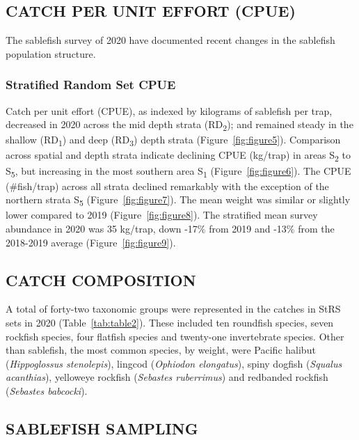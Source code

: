 \documentclass[12pt]{article}\usepackage[]{graphicx}\usepackage[]{color}
\begin{document}
\hypertarget{catch-per-unit-effort-cpue}{%
\subsection{CATCH PER UNIT EFFORT (CPUE)}\label{catch-per-unit-effort-cpue}}

The sablefish survey of 2020 have documented recent changes in the sablefish population structure.

\hypertarget{stratified-random-set-cpue}{%
\subsubsection{Stratified Random Set CPUE}\label{stratified-random-set-cpue}}

Catch per unit effort (CPUE), as indexed by kilograms of sablefish per trap, decreased in 2020 across the mid depth strata (RD\textsubscript{2}); and remained steady in the shallow (RD\textsubscript{1}) and deep (RD\textsubscript{3}) depth strata (Figure~\ref{fig:figure5}). Comparison across spatial and depth strata indicate declining CPUE (kg/trap) in areas S\textsubscript{2} to S\textsubscript{5}, but increasing in the most southern area S\textsubscript{1} (Figure~\ref{fig:figure6}). The CPUE (\#fish/trap) across all strata declined remarkably with the exception of the northern strata S\textsubscript{5} (Figure~\ref{fig:figure7}). The mean weight was similar or slightly lower compared to 2019 (Figure~\ref{fig:figure8}). The stratified mean survey abundance in 2020 was 35 kg/trap, down -17\% from 2019 and -13\% from the 2018-2019 average (Figure~\ref{fig:figure9}).

\hypertarget{catch-composition}{%
\subsection{CATCH COMPOSITION}\label{catch-composition}}

A total of forty-two taxonomic groups were represented in the catches in StRS sets in 2020 (Table~\ref{tab:table2}). These included ten roundfish species, seven rockfish species, four flatfish species and twenty-one invertebrate species. Other than sablefish, the most common species, by weight, were Pacific halibut (\emph{Hippoglossus stenolepis}), lingcod (\emph{Ophiodon elongatus}), spiny dogfish (\emph{Squalus acanthias}), yelloweye rockfish (\emph{Sebastes ruberrimus}) and redbanded rockfish (\emph{Sebastes babcocki}).

\hypertarget{sablefish-sampling}{%
\subsection{SABLEFISH SAMPLING}\label{sablefish-sampling}}
\end{document}
